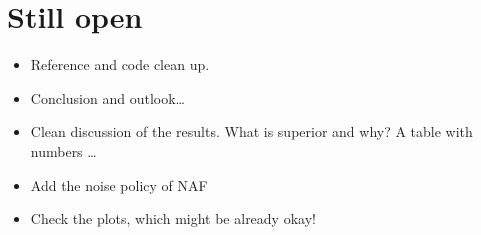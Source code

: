 \documentclass[
reprint,
amsmath,amssymb,amsfonts,clevref,
aps,
prstab,
]{revtex4-2}
\begin{document}
\section{Still open}
	\begin{itemize}
	\item Reference and code clean up.
	\item Conclusion and outlook\dots
	\item Clean discussion of the results. What is superior and why? A table with numbers \dots
	\item Add the noise policy of NAF
	\item Check the plots, which might be already okay!
\end{itemize}
	
	
	
	

	\newpage{\pagestyle{empty}\cleardoublepage}
	
\end{document}

